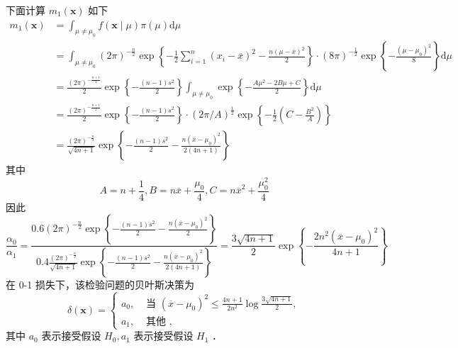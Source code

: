\documentclass[UTF8,openany]{book}
\begin{document}
	下面计算 $m_1(\boldsymbol{x})$ 如下
	$$
	\begin{aligned}
		m_1(\boldsymbol{x}) & =\int_{\mu \neq \mu_0} f(\boldsymbol{x} \mid \mu) \pi(\mu) \mathrm{d} \mu \\
		& =\int_{\mu \neq \mu_0}(2 \pi)^{-\frac{n}{2}} \exp \left\{-\frac{1}{2} \sum_{i=1}^n\left(x_i-\overline{x}\right)^2-\frac{n(\mu-\overline{x})^2}{2}\right\} \cdot(8 \pi)^{-\frac{1}{2}} \exp \left\{-\frac{\left(\mu-\mu_0\right)^2}{8}\right\} \mathrm{d} \mu \\
		& =\frac{(2 \pi)^{-\frac{n+1}{2}}}{2} \exp \left\{-\frac{(n-1) s^2}{2}\right\} \int_{\mu \neq \mu_0} \exp \left\{-\frac{A \mu^2-2 B \mu+C}{2}\right\} \mathrm{d} \mu \\
		& =\frac{(2 \pi)^{-\frac{n+1}{2}}}{2} \exp \left\{-\frac{(n-1) s^2}{2}\right\} \cdot(2 \pi / A)^{\frac{1}{2}} \exp \left\{-\frac{1}{2}\left(C-\frac{B^2}{A}\right)\right\} \\
		& =\frac{(2 \pi)^{-\frac{n}{2}}}{\sqrt{4 n+1}} \exp \left\{-\frac{(n-1) s^2}{2}-\frac{n\left(\overline{x}-\mu_0\right)^2}{2(4 n+1)}\right\}
	\end{aligned}
	$$
	其中 
	$$A=n+\frac{1}{4}, B=n \overline{x}+\frac{\mu_0}{4}, C=n \overline{x}^2+\frac{\mu_0^2}{4}$$
	因此
	$$
	\frac{\alpha_0}{\alpha_1}=\frac{0.6(2 \pi)^{-\frac{n}{2}} \exp \left\{-\frac{(n-1) s^2}{2}-\frac{n\left(\overline{x}-\mu_0\right)^2}{2}\right\}}{0.4 \frac{(2 \pi)^{-\frac{n}{2}}}{\sqrt{4 n+1}} \exp \left\{-\frac{(n-1) s^2}{2}-\frac{n\left(\overline{x}-\mu_0\right)^2}{2(4 n+1)}\right\}}=\frac{3 \sqrt{4 n+1}}{2} \exp \left\{-\frac{2 n^2\left(\overline{x}-\mu_0\right)^2}{4 n+1}\right\}
	$$
	在 0-1 损失下，该检验问题的贝叶斯决策为
	$$
	\delta(\boldsymbol{x})= \begin{cases}a_0, & \text { 当 }\left(\overline{x}-\mu_0\right)^2 \leq \frac{4 n+1}{2 n^2} \log \frac{3 \sqrt{4 n+1}}{2}, \\ a_1, & \text { 其他 },\end{cases}
	$$
	其中 $a_0$ 表示接受假设 $H_0, a_1$ 表示接受假设 $H_1$ ．\\
	
	
	
\end{document}
